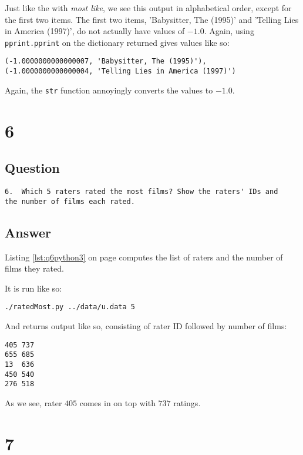 \documentclass[letterpaper,11pt]{article}
\begin{document}
Just like the with \emph{most like}, we see this output in alphabetical order, except for the first two items.  The first two items, 'Babysitter, The (1995)' and 'Telling Lies in America (1997)', do not actually have values of $-1.0$.  Again, using \verb+pprint.pprint+ on the dictionary returned gives values like so:
\begin{lstlisting}[frame=single]
(-1.0000000000000007, 'Babysitter, The (1995)'),
(-1.0000000000000004, 'Telling Lies in America (1997)')
\end{lstlisting}

Again, the \verb+str+ function annoyingly converts the values to $-1.0$.

\newpage

\section*{6}

\subsection*{Question}

\begin{verbatim}
6.  Which 5 raters rated the most films? Show the raters' IDs and
the number of films each rated.
\end{verbatim}

\subsection*{Answer}

Listing \ref{lst:q6python3} on page \pageref{lst:q6python3} computes the list of raters and the number of films they rated.

It is run like so:
\begin{lstlisting}[frame=single]
./ratedMost.py ../data/u.data 5
\end{lstlisting}

And returns output like so, consisting of rater ID followed by number of films:
\begin{lstlisting}[frame=single]
405	737
655	685
13	636
450	540
276	518
\end{lstlisting}

As we see, rater $405$ comes in on top with $737$ ratings.

\newpage

\section*{7}
\end{document}
